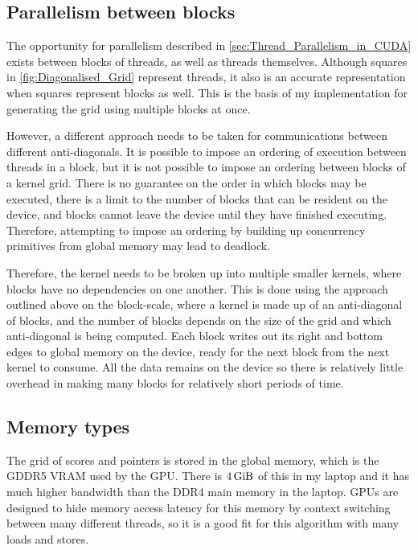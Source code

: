 \subsection{Parallelism between blocks}
\label{sec:Block_Parallelism_in_CUDA}

The opportunity for parallelism described in \cref{sec:Thread_Parallelism_in_CUDA} exists between blocks of threads, as well as threads themselves.
Although squares in \cref{fig:Diagonalised_Grid} represent threads, it also is an accurate representation when squares represent blocks as well.
This is the basis of my implementation for generating the grid using multiple blocks at once.

However, a different approach needs to be taken for communications between different anti-diagonals.
It is possible to impose an ordering of execution between threads in a block, but it is not possible to impose an ordering between blocks of a kernel grid.
There is no guarantee on the order in which blocks may be executed, there is a limit to the number of blocks that can be resident on the device, and blocks cannot leave the device until they have finished executing.
Therefore, attempting to impose an ordering by building up concurrency primitives from global memory may lead to deadlock.

Therefore, the kernel needs to be broken up into multiple smaller kernels, where blocks have no dependencies on one another.
This is done using the approach outlined above on the block-scale, where a kernel is made up of an anti-diagonal of blocks, and the number of blocks depends on the size of the grid and which anti-diagonal is being computed.
Each block writes out its right and bottom edges to global memory on the device, ready for the next block from the next kernel to consume.
All the data remains on the device so there is relatively little overhead in making many blocks for relatively short periods of time.

\subsection{Memory types}
\label{sec:Memory_in_CUDA}

The grid of scores and pointers is stored in the global memory, which is the GDDR5 VRAM used by the GPU.
There is $\SI{4}{\gibi\byte}$ of this in my laptop and it has much higher bandwidth than the DDR4 main memory in the laptop.
GPUs are designed to hide memory access latency for this memory by context switching between many different threads, so it is a good fit for this algorithm with many loads and stores.

